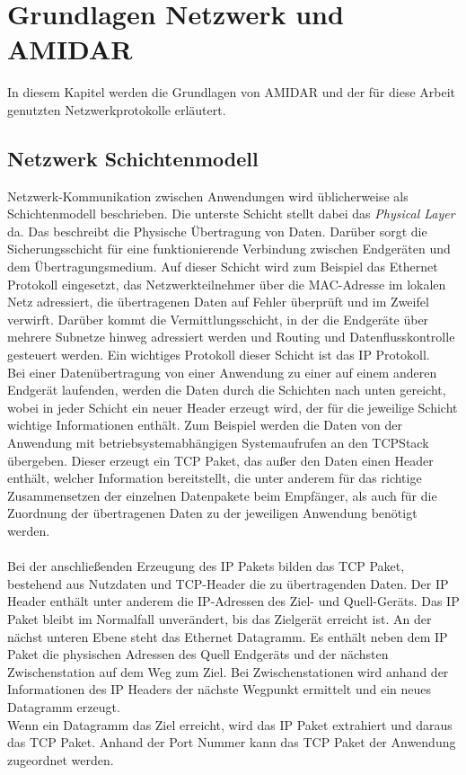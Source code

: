 \chapter{Grundlagen Netzwerk und AMIDAR}
In diesem Kapitel werden die Grundlagen von AMIDAR und der für diese Arbeit genutzten Netzwerkprotokolle erläutert. 

\section{Netzwerk Schichtenmodell}
Netzwerk-Kommunikation zwischen Anwendungen wird üblicherweise als Schichtenmodell beschrieben.  
Die unterste Schicht stellt dabei das \textit{Physical Layer} da. Das beschreibt die Physische Übertragung von Daten. 
Darüber sorgt die Sicherungsschicht für eine funktionierende Verbindung zwischen Endgeräten und dem Übertragungsmedium. Auf dieser Schicht wird zum Beispiel das Ethernet Protokoll eingesetzt, das Netzwerkteilnehmer über die MAC-Adresse im lokalen Netz adressiert, die übertragenen Daten auf Fehler überprüft und im Zweifel verwirft. 
Darüber kommt die Vermittlungsschicht, in der die Endgeräte über mehrere Subnetze hinweg adressiert werden und Routing und Datenflusskontrolle gesteuert werden. Ein wichtiges Protokoll dieser Schicht ist das IP Protokoll. \\
Bei einer Datenübertragung von einer Anwendung zu einer auf einem anderen Endgerät laufenden, werden die Daten durch die Schichten nach unten gereicht, wobei in jeder Schicht ein neuer Header erzeugt wird, der für die jeweilige Schicht wichtige Informationen enthält. Zum Beispiel werden die Daten von der Anwendung mit betriebsystemabhängigen Systemaufrufen an den TCPStack übergeben. Dieser erzeugt ein TCP Paket, das außer den Daten einen Header enthält, welcher Information bereitstellt, die unter anderem für das richtige Zusammensetzen der einzelnen Datenpakete beim Empfänger, als auch für die Zuordnung der übertragenen Daten zu der jeweiligen Anwendung benötigt werden.\\\\
Bei der anschließenden Erzeugung des IP Pakets bilden das TCP Paket, bestehend aus Nutzdaten und TCP-Header die zu übertragenden Daten. Der IP Header enthält unter anderem die IP-Adressen des Ziel- und Quell-Geräts. Das IP Paket bleibt im Normalfall unverändert, bis das Zielgerät erreicht ist. An der nächst unteren Ebene steht das Ethernet Datagramm. Es enthält neben dem IP Paket die physischen Adressen des Quell Endgeräts und der nächsten Zwischenstation auf dem Weg zum Ziel. Bei Zwischenstationen wird anhand der Informationen des IP Headers der nächste Wegpunkt ermittelt und ein neues Datagramm erzeugt. \\
Wenn ein Datagramm das Ziel erreicht, wird das IP Paket extrahiert und daraus das TCP Paket. Anhand der Port Nummer kann das TCP Paket der Anwendung zugeordnet werden.



